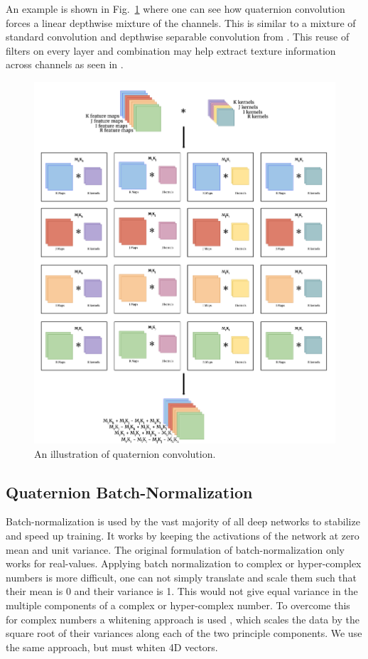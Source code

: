 \documentclass[14pt,a4paper]{article}
\begin{document}
An example is shown in Fig.~\ref{f:quatconv} where one can see how quaternion convolution forces a linear depthwise mixture of the channels. This is similar to a mixture of standard convolution and depthwise separable convolution from \cite{chollet2016xception}. This reuse of filters on every layer and combination may help extract texture information across channels as seen in \cite{shi2007quaternion}.

\begin{figure}[h]
	\centering
		\includegraphics[width=1.0\textwidth]{figures/quatconv.png}
	\caption{An illustration of quaternion convolution.}
	\label{f:quatconv}
\end{figure}


\subsection{Quaternion Batch-Normalization}
Batch-normalization \cite{ioffe2015batch} is used by the vast majority of all deep networks to stabilize and speed up training.
It works by keeping the activations of the network at zero mean and unit variance.
The original formulation of batch-normalization only works for real-values. 
Applying batch normalization to complex or hyper-complex numbers is more difficult, one can not simply translate and scale them such that their mean is 0 and their variance is 1.
This would not give equal variance in the multiple components of a complex or hyper-complex number.
To overcome this for complex numbers a whitening approach is used \cite{trabelsi2017deep}, which scales the data by the square root of their variances along each of the two principle components.
We use the same approach, but must whiten 4D vectors.
\end{document}
